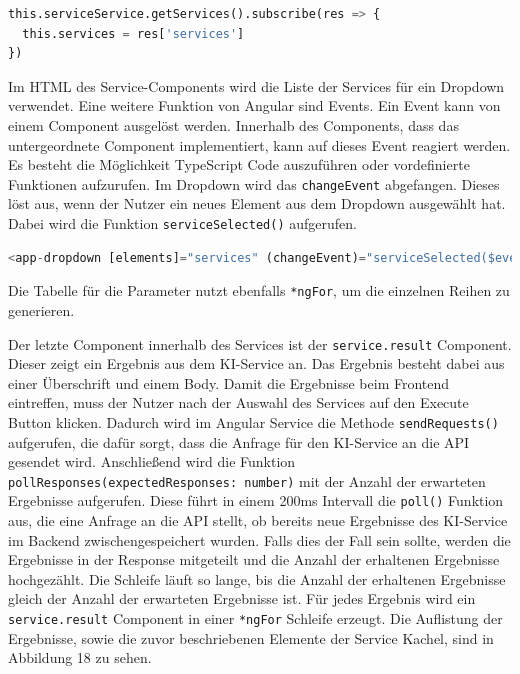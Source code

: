 \begin{lstlisting}[language=Python]
this.serviceService.getServices().subscribe(res => {
  this.services = res['services']
})
\end{lstlisting}

Im HTML des Service-Components wird die Liste der Services für ein Dropdown verwendet. Eine weitere Funktion von Angular sind Events. Ein Event kann von einem Component ausgelöst werden. Innerhalb des Components, dass das untergeordnete Component implementiert, kann auf dieses Event reagiert werden. Es besteht die Möglichkeit TypeScript Code auszuführen oder vordefinierte Funktionen aufzurufen. Im Dropdown wird das \texttt{changeEvent} abgefangen. Dieses löst aus, wenn der Nutzer ein neues Element aus dem Dropdown ausgewählt hat. Dabei wird die Funktion \texttt{serviceSelected()} aufgerufen.

\begin{lstlisting}[language=Python]
<app-dropdown [elements]="services" (changeEvent)="serviceSelected($event)"></app-dropdown>
\end{lstlisting}

Die Tabelle für die Parameter nutzt ebenfalls \texttt{*ngFor}, um die einzelnen Reihen zu generieren. 

Der letzte Component innerhalb des Services ist der \texttt{service.result} Component. Dieser zeigt ein Ergebnis aus dem KI-Service an. Das Ergebnis besteht dabei aus einer Überschrift und einem Body. Damit die Ergebnisse beim Frontend eintreffen, muss der Nutzer nach der Auswahl des Services auf den \glqq Execute\grqq{} Button klicken. Dadurch wird im Angular Service die Methode \texttt{sendRequests()} aufgerufen, die dafür sorgt, dass die Anfrage für den KI-Service an die API gesendet wird. Anschließend wird die Funktion \texttt{pollResponses(expectedResponses: number)} mit der Anzahl der erwarteten Ergebnisse aufgerufen. Diese führt in einem 200ms Intervall die \texttt{poll()} Funktion aus, die eine Anfrage an die API stellt, ob bereits neue Ergebnisse des KI-Service im Backend zwischengespeichert wurden. Falls dies der Fall sein sollte, werden die Ergebnisse in der Response mitgeteilt und die Anzahl der erhaltenen Ergebnisse hochgezählt. Die Schleife läuft so lange, bis die Anzahl der erhaltenen Ergebnisse gleich der Anzahl der erwarteten Ergebnisse ist. Für jedes Ergebnis wird ein \texttt{service.result} Component in einer \texttt{*ngFor} Schleife erzeugt. Die Auflistung der Ergebnisse, sowie die zuvor beschriebenen Elemente der \glqq Service\grqq{} Kachel, sind in Abbildung 18 zu sehen. 

